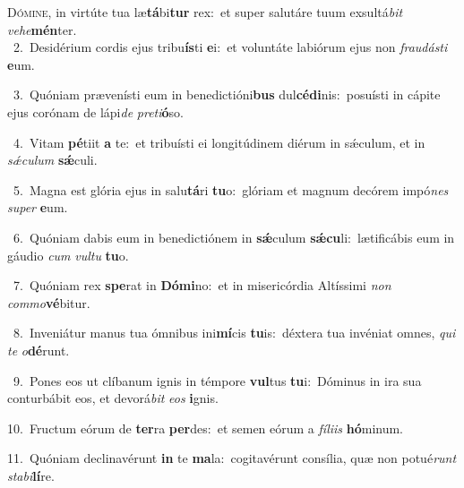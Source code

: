 \lettrine{\initial\textcolor{\initialcolor}{D}}{ómine,} in virtúte tua læ\-\textbf{tá}\-bi\textbf{tur} rex:~\star et super salutáre tuum exsultá\textit{bit} \textit{ve}\-\textit{he}\textbf{mén}ter.\\
{\numbfont\textcolor{\numbcolor}{~2.}}~Desidérium cordis ejus tribu\-\textbf{ís}\-ti \textbf{e}\-i:~\star et voluntáte labiórum ejus non \textit{frau}\-\textit{dás}\textit{ti} \textbf{e}\-um.\par
{\numbfont\textcolor{\numbcolor}{~3.}}~Quóniam prævenísti eum in benedictióni\textbf{bus} dul\-\textbf{cé}\-\textbf{di}nis:~\star posuísti in cápite ejus corónam de lápi\textit{de} \textit{pre}\-\textit{ti}\textbf{ó}so.\par
{\numbfont\textcolor{\numbcolor}{~4.}}~Vitam \textbf{pé}\-tiit \textbf{a} te:~\star et tribuísti ei longitúdinem diérum in sǽculum, et in \textit{sǽ}\-\textit{cu}\textit{lum} \textbf{sǽ}\-culi.\par
{\numbfont\textcolor{\numbcolor}{~5.}}~Magna est glória ejus in salu\-\textbf{tá}\-ri \textbf{tu}\-o:~\star glóriam et magnum decórem impó\textit{nes} \textit{su}\-\textit{per} \textbf{e}\-um.\par
{\numbfont\textcolor{\numbcolor}{~6.}}~Quóniam dabis eum in benedictiónem in \textbf{sǽ}\-culum \textbf{sǽ}\-\textbf{cu}li:~\star lætificábis eum in gáudio \textit{cum} \textit{vul}\-\textit{tu} \textbf{tu}\-o.\par
{\numbfont\textcolor{\numbcolor}{~7.}}~Quóniam rex \textbf{spe}\-rat in \textbf{Dó}\-\textbf{mi}no:~\star et in misericórdia Altíssimi \textit{non} \textit{com}\-\textit{mo}\textbf{vé}bitur.\par
{\numbfont\textcolor{\numbcolor}{~8.}}~Inveniátur manus tua ómnibus ini\-\textbf{mí}\-cis \textbf{tu}\-is:~\star déxtera tua invéniat omnes, \textit{qui} \textit{te} \textit{o}\-\textbf{dé}runt.\par
{\numbfont\textcolor{\numbcolor}{~9.}}~Pones eos ut clíbanum ignis in témpore \textbf{vul}\-tus \textbf{tu}\-i:~\star Dóminus in ira sua conturbábit eos, et devorá\textit{bit} \textit{e}\-\textit{os} \textbf{i}\-gnis.\par
{\numbfont\textcolor{\numbcolor}{10.}}~Fructum eórum de \textbf{ter}\-ra \textbf{per}\-des:~\star et semen eórum a \textit{fí}\-\textit{li}\textit{is} \textbf{hó}\-minum.\par
{\numbfont\textcolor{\numbcolor}{11.}}~Quóniam declinavérunt \textbf{in} te \textbf{ma}\-la:~\star cogitavérunt consília, quæ non potué\textit{runt} \textit{sta}\-\textit{bi}\textbf{lí}re.\par
